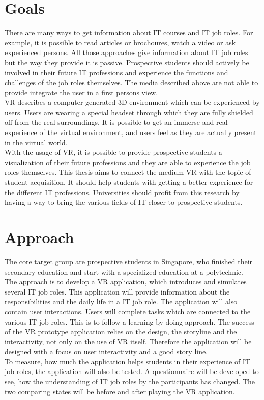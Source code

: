 \section{Goals}
There are many ways to get information about IT courses and IT job roles. For example, it is possible to read articles or brochoures, watch a video or ask experienced persons. All those approaches give information about IT job roles but the way they  provide it is passive. Prospective students should actively be involved in their future IT professions and experience the functions and challenges of the job roles themselves. The media described above are not able to provide integrate the user in a first persons view. \\
 VR describes a computer generated 3D environment which can be experienced by users. Users are wearing a special headset through which they are fully shielded off from the real surroundings. It is possible to get an immerse and real experience of the virtual environment, and users feel as they are actually present in the virtual world. \cite{Linowes.2015}\\
With the usage of VR, it is possible to provide prospective students a visualization of their future professions and they are able to experience the job roles themselves. This thesis aims to connect the medium VR with the topic of student acquisition. It should help students with getting a better experience for the different IT professions. Universities should profit from this research by having a way to bring the various fields of IT closer to prospective students.

\section{Approach}
The core target group are prospective students in Singapore, who finished their secondary education and start with a specialized education at a polytechnic.\\
The approach is to develop a VR application, which introduces and simulates several IT job roles. This application will provide information about the responsibilities and the daily life in a IT job role. The application will also contain user interactions. Users will complete tasks which are connected to the various IT job roles. This is to follow a learning-by-doing approach. The success of the VR prototype application relies on the design, the storyline and the interactivity, not only on the use of VR itself. Therefore the application will be designed with a focus on user interactivity and a good story line.\\
To measure, how much the application helps students in their experience of IT job roles, the application will also be tested. A questionnaire will be developed to see, how the understanding of IT job roles by the participants has changed. The two comparing states will be before and after playing the VR application.

